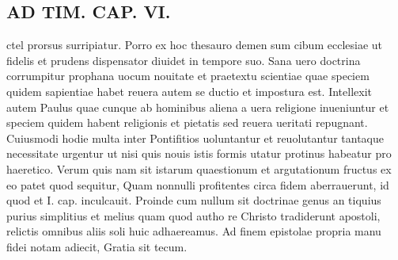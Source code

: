 \documentclass{article}
\begin{document}
\begin{pages}
\section*{AD TIM. CAP. VI. }
\marginpar{[ p.174 ]}\pstart ctel prorsus surripiatur. Porro ex hoc thesauro demen sum cibum ecclesiae ut fidelis et prudens dispensator diuidet in tempore suo. Sana uero doctrina corrumpitur prophana uocum nouitate et praetextu scientiae quae speciem quidem sapientiae habet reuera autem se ductio et impostura est. Intellexit autem Paulus quae cunque ab hominibus aliena a uera religione inueniuntur et speciem quidem habent religionis et pietatis sed reuera ueritati repugnant. Cuiusmodi hodie multa inter Pontifitios uoluntantur et reuolutantur tantaque necessitate urgentur ut nisi quis nouis istis formis utatur protinus habeatur pro haeretico. Verum quis nam sit istarum quaestionum et argutationum fructus ex eo patet quod sequitur, Quam nonnulli profitentes circa fidem aberrauerunt, id quod et I. cap. inculcauit. Proinde cum nullum sit doctrinae genus an tiquius purius simplitius et melius quam quod autho re Christo tradiderunt apostoli, relictis omnibus aliis soli huic adhaereamus. Ad finem epistolae propria manu fidei notam adiecit, Gratia sit tecum.  \pend
\endnumbering
\end{pages}
\end{document}

